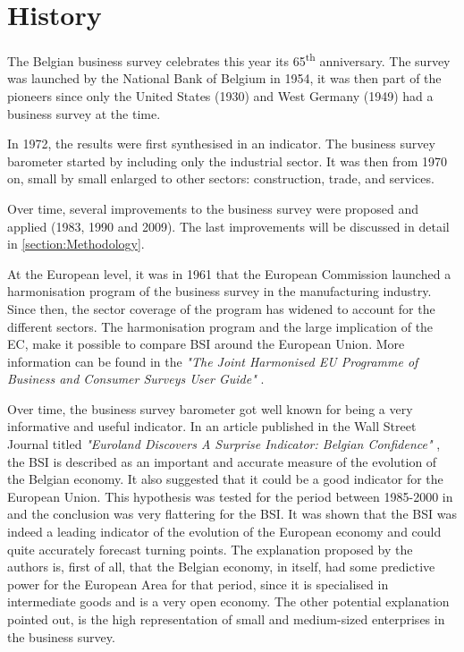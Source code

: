 \documentclass[12pt,a4paper,oneside]{book}
\begin{document}
\section{History}

The Belgian business survey celebrates this year its 65\textsuperscript{th} anniversary. The survey was launched by the National Bank of Belgium in 1954, it was then part of the pioneers since only the United States (1930) and West Germany (1949) had a business survey at the time.

In 1972, the results were first synthesised in an indicator.
The business survey barometer started by including only the industrial sector. It was then from 1970 on, small by small enlarged to other sectors: construction, trade, and services. 

Over time, several improvements to the business survey were proposed and applied (1983, 1990 and 2009). The last improvements will be discussed in detail in \autoref{section:Methodology}.

At the European level, it was in 1961 that the European Commission launched a harmonisation program of the business survey in the manufacturing industry. 
Since then, the sector coverage of the program has widened to account for the different sectors.
The harmonisation program and the large implication of the EC, make it possible to compare BSI around the European Union.
More information can be found in the \textit{"The Joint Harmonised EU Programme of Business and Consumer Surveys User Guide"} \cite{european_commission_joint_2016}.

Over time, the business survey barometer got well known for being a very informative and useful indicator. 
In an article published in the Wall Street Journal titled \textit{"Euroland Discovers A Surprise Indicator: Belgian Confidence"} \citep{rhoads_euroland_1999}, the BSI is described as an important and accurate measure of the evolution of the Belgian economy. 
It also suggested that it could be a good indicator for the European Union. 
This hypothesis was tested for the period between 1985-2000 in \cite{vanhaelen_belgian_2000} and the conclusion was very flattering for the BSI. 
It was shown that the BSI was indeed a leading indicator of the evolution of the European economy and could quite accurately forecast turning points. 
The explanation proposed by the authors is, first of all, that the Belgian economy, in itself, had some predictive power for the European Area for that period, since it is specialised in intermediate goods and is a very open economy. 
The other potential explanation pointed out, is the high representation of small and medium-sized enterprises in the business survey.
\end{document}
